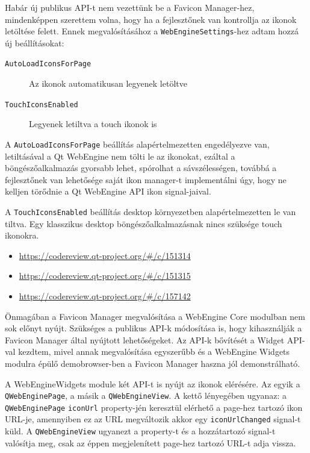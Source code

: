 \documentclass[12pt]{report}
\let\origurl\url
\renewcommand{\url}[1]{%
    \textcolor{blue}{\origurl{#1}}
}
\newcommand{\gerrit}[1]{%
    \textcolor{qtgreen}{\origurl{https://codereview.qt-project.org/\#/c/#1}}
}
\begin{document}
Habár új publikus API-t nem vezettünk be a Favicon Manager-hez, mindenképpen szerettem volna,
hogy ha a fejlesztőnek van kontrollja az ikonok letöltése felett. Ennek megvalósításához
a \texttt{WebEngineSettings}-hez adtam hozzá új beállításokat:
\begin{description}
    \item[\texttt{AutoLoadIconsForPage}] Az ikonok automatikusan legyenek letöltve
    \item[\texttt{TouchIconsEnabled}] Legyenek letiltva a touch ikonok is
\end{description}

A \texttt{AutoLoadIconsForPage} beállítás alapértelmezetten engedélyezve van, letiltásával
a Qt WebEngine nem tölti le az ikonokat, ezáltal a böngészőalkalmazás gyorsabb lehet,
spórolhat a sávszélességen, továbbá a fejlesztőnek van lehetősége saját ikon manager-t
implementálni úgy, hogy ne kelljen törődnie a Qt WebEngine API ikon signal-jaival.

A \texttt{TouchIconsEnabled} beállítás desktop környezetben alapértelmezetten le van tiltva.
Egy klasszikus desktop böngészőalkalmazásnak nincs szüksége touch ikonokra.

\begin{center}
    \begin{reviewbox}
        \begin{itemize}
            \renewcommand{\labelitemi}{\textcolor{qtgreen}{$\blacktriangleright$}}
            \item \gerrit{151314}
            \item \gerrit{151315}
            \item \gerrit{157142}
        \end{itemize}
    \end{reviewbox}
\end{center}

Önmagában a Favicon Manager megvalósítása a WebEngine Core modulban nem sok előnyt nyújt.
Szükséges a publikus API-k módosítása is, hogy kihasználják a Favicon Manager által nyújtott
lehetőségeket. Az API-k bővítését a Widget API-val kezdtem, mivel annak megvalósítása
egyszerűbb és a WebEngine Widgets modulra épülő demobrowser-ben a Favicon Manager haszna
jól demonstrálható.

A WebEngineWidgets module két API-t is nyújt az ikonok elérésére. Az egyik a
\texttt{QWebEnginePage}, a másik a \texttt{QWebEngineView}. A kettő lényegében ugyanaz:
a \texttt{QWebEnginePage} \texttt{iconUrl} property-jén keresztül elérhető a page-hez
tartozó ikon URL-je, amennyiben ez az URL megváltozik akkor egy \texttt{iconUrlChanged}
signal-t küld. A \texttt{QWebEngineView} ugyanezt a property-t és a hozzátartozó signal-t
valósítja meg, csak az éppen megjelenített page-hez tartozó URL-t adja vissza.
\end{document}
